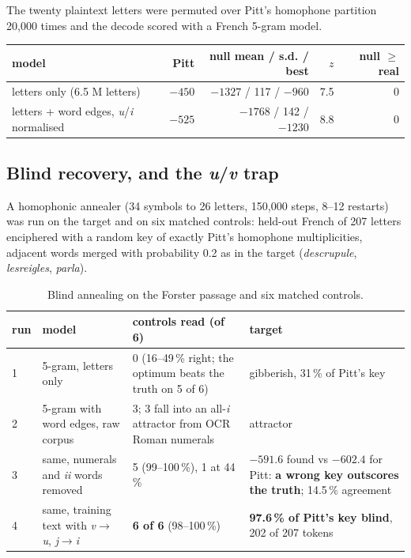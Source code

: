\documentclass[11pt]{article}
\begin{document}
The twenty plaintext letters were permuted over Pitt's homophone partition 20,000 times and the decode scored with a French 5-gram model.

\begin{center}\small
\begin{tabular}{@{}lrrrr@{}}
\toprule
model & Pitt & null mean / s.d. / best & $z$ & null $\geq$ real \\
\midrule
letters only (6.5 M letters) & $-450$ & $-1327$ / 117 / $-960$ & 7.5 & 0 \\
letters + word edges, \emph{u}/\emph{i} normalised & $-525$ & $-1768$ / 142 / $-1230$ & 8.8 & 0 \\
\bottomrule
\end{tabular}
\end{center}

\subsection{Blind recovery, and the \emph{u}/\emph{v} trap}

A homophonic annealer (34 symbols to 26 letters, 150,000 steps, 8--12 restarts) was run on the target and on six matched controls: held-out French of 207 letters enciphered with a random key of exactly Pitt's homophone multiplicities, adjacent words merged with probability 0.2 as in the target (\emph{descrupule}, \emph{lesreigles}, \emph{parla}).

\begin{table}[t]
\centering\small
\begin{tabular}{@{}lllp{4.2cm}@{}}
\toprule
run & model & controls read (of 6) & target \\
\midrule
1 & 5-gram, letters only & 0 (16--49\,\% right; the optimum beats the truth on 5 of 6) & gibberish, 31\,\% of Pitt's key \\
2 & 5-gram with word edges, raw corpus & 3; 3 fall into an all-\emph{i} attractor from OCR Roman numerals & attractor \\
3 & same, numerals and \emph{ii} words removed & 5 (99--100\,\%), 1 at 44\,\% & $-591.6$ found vs $-602.4$ for Pitt: \textbf{a wrong key outscores the truth}; 14.5\,\% agreement \\
4 & same, training text with \emph{v}$\to$\emph{u}, \emph{j}$\to$\emph{i} & \textbf{6 of 6} (98--100\,\%) & \textbf{97.6\,\% of Pitt's key blind}, 202 of 207 tokens \\
\bottomrule
\end{tabular}
\caption{\label{tab:runs} Blind annealing on the Forster passage and six matched controls.}
\end{table}
\end{document}
